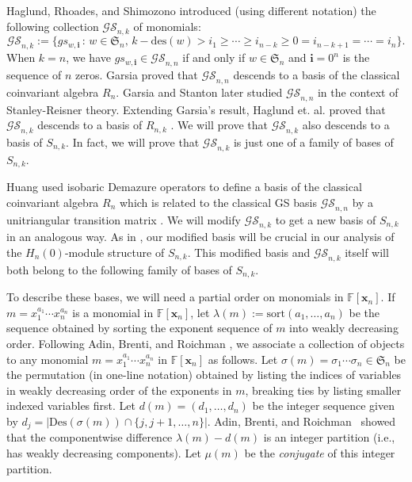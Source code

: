 \documentclass[ALCO,ThmDefs,published]{cedram}
\newcommand{\symm}{{\mathfrak{S}}}
\newcommand{\xx}{{\mathbf {x}}}
\newcommand{\FF}{{\mathbb{F}}}
\theoremstyle{plain}
\newcommand{\Des}{{\mathrm {Des}}}
\newcommand{\des}{{\mathrm {des}}}
\newcommand{\symm}{{\mathfrak{S}}}
\newcommand{\FF}{{\mathbb{F}}}
\newcommand{\GS}{{\mathcal{GS}}}
\newcommand{\xx}{{\mathbf {x}}}
\newcommand{\ii}{{\mathbf{i}}}
\begin{document}
Haglund, Rhoades, and Shimozono introduced \cite[Defn. 5.2]{HRS} (using different notation) the following 
collection $\GS_{n,k}$ of monomials:
\begin{equation*}
\GS_{n,k} := \{ gs_{w,\ii} \,:\, w \in \symm_n, \, k - \des(w) > i_1 \geq \cdots \geq i_{n-k} \geq 0 = i_{n-k+1} = \cdots = i_n\}.
\end{equation*}
When $k = n$, we have $gs_{w,\ii}\in\GS_{n,n}$ if and only if $w\in\symm_n$ and $\ii=0^n$ is the sequence of $n$ zeros.
Garsia \cite{Garsia} proved that $\GS_{n,n}$ descends to a basis of the classical coinvariant algebra $R_n$.
Garsia and Stanton \cite{GS} later studied $\GS_{n,n}$ in the context of Stanley-Reisner theory. 
Extending Garsia's result,
Haglund et. al. proved that $\GS_{n,k}$ descends to a basis of $R_{n,k}$ \cite[Thm. 5.3]{HRS}.
We will prove that $\GS_{n,k}$ also descends to a basis of $S_{n,k}$.  In fact, we will 
prove that $\GS_{n,k}$ is just one of a family of bases of $S_{n,k}$.

Huang used isobaric Demazure operators to define a basis of the classical coinvariant algebra $R_n$
which is related to the classical GS basis $\GS_{n,n}$ by a unitriangular transition matrix \cite{Huang}.
We will modify $\GS_{n,k}$ to get a new basis of $S_{n,k}$ in an analogous way.
As in \cite{Huang}, our modified basis will be crucial in our analysis of the $H_n(0)$-module structure of $S_{n,k}$.
This modified basis and $\GS_{n,k}$ itself will both belong to the following family of bases of $S_{n,k}$.

To describe these bases, we will need a partial order on monomials in $\FF[\xx_n]$.
If $m = x_1^{a_1} \cdots x_n^{a_n}$ is a monomial in $\FF[\xx_n]$, let $\lambda(m) := \mathrm{sort}(a_1, \dots, a_n)$
be the sequence obtained by sorting the exponent sequence of $m$ into weakly decreasing order.
Following Adin, Brenti, and Roichman \cite{ABR}, we associate a collection of objects to any monomial
$m = x_1^{a_1} \cdots x_n^{a_n}$ in $\FF[\xx_n]$ as follows.
Let $\sigma(m)=\sigma_1\cdots \sigma_n\in\symm_n$
 be the permutation (in one-line notation) obtained by listing the indices of variables in 
weakly decreasing order of the exponents in $m$, breaking ties by listing smaller indexed variables first.
Let $d(m) = (d_1, \dots, d_n)$ be the integer sequence given by 
$d_j = |\Des(\sigma(m)) \cap \{j, j+1, \dots, n\} |$.  
Adin, Brenti, and Roichman~\cite{ABR} showed that the componentwise difference
$\lambda(m) - d(m)$ is an integer partition (i.e., has weakly decreasing components).
Let $\mu(m)$ be the \emph{conjugate} of this integer partition.
\end{document}
